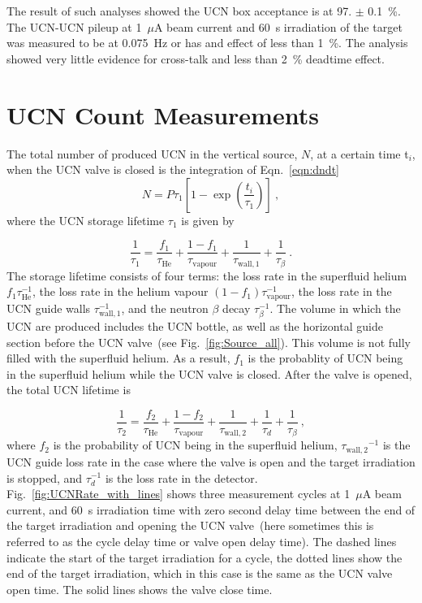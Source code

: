 The result of such analyses showed the UCN box acceptance is at
97. $\pm$ 0.1~\%. The UCN-UCN pileup at 1~$\mu$A beam current and 60~s
irradiation of the target was measured to be at 0.075~Hz or has and
effect of less than 1~\%. The analysis showed very little evidence for
cross-talk and less than 2~\% deadtime effect.



\section{UCN Count Measurements \label{UCNCounts}}

The total number of produced UCN in the vertical source, $N$, at a
certain time t$_i$, when the UCN valve is closed is the integration of
Eqn.~\ref{eqn:dndt}
\begin{equation}
  \label{eq:totalUCN}
  N = P \tau_1\left[ 1- \exp \left(\frac{t_i }{ \tau_1}\right) \right]~,
\end{equation}
where the UCN storage lifetime $\tau_1$ is given by

\begin{equation}
  \label{eqn:tau1}
  \frac{1}{\tau_1} = \frac{ f_1}{\tau_\mathrm{He}} + \frac{1-f_1}{\tau_\mathrm{vapour}}+\frac{1}{\tau_\mathrm{wall,1}} + \frac{1}{\tau_\beta}~.
\end{equation}
The storage lifetime consists of four terms: the loss rate in the
superfluid helium $ f_1\tau_\mathrm{He}^{-1}$, the loss rate in the
helium vapour $(1-f_1)\tau_\mathrm{vapour}^{-1}$, the loss rate in the
UCN guide walls $\tau_\mathrm{wall,1}^{-1}$, and the neutron $\beta$
decay $\tau_\beta^{-1}$. The volume in which the UCN are produced
includes the UCN bottle, as well as the horizontal guide section
before the UCN valve~(see Fig.~\ref{fig:Source_all}). This volume is
not fully filled with the superfluid helium. As a result, $ f_1$ is
the probablity of UCN being in the superfluid helium while the UCN
valve is closed. After the valve is opened, the total UCN lifetime is

\begin{equation}
  \label{eqn:tau2}
  \frac{1}{\tau_2} = \frac{ f_2}{\tau_\mathrm{He}} + \frac{1-f_2}{\tau_\mathrm{vapour}}+ \frac{1}{\tau_\mathrm{wall,2}}+\frac{1}{\tau_d} + \frac{1}{\tau_\beta}~,
\end{equation}
where $f_2$ is the probability of UCN being in the superfluid helium,
${\tau_\mathrm{wall,2}}^{-1}$ is the UCN guide loss rate in the case
where the valve is open and the target irradiation is stopped, and
$\tau_d^{-1}$ is the loss rate in the
detector. Fig.~\ref{fig:UCNRate_with_lines} shows three measurement
cycles at 1~$\mu$A beam current, and 60~s irradiation time with zero
second delay time between the end of the target irradiation and
opening the UCN valve~(here sometimes this is referred to as the cycle
delay time or valve open delay time). The dashed lines indicate the
start of the target irradiation for a cycle, the dotted lines show the
end of the target irradiation, which in this case is the same as the
UCN valve open time. The solid lines shows the valve close time.


